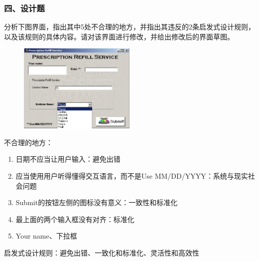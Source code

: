 \subsubsection*{四、设计题}
\setcounter{problemname}{0}

\begin{problem}
分析下图界面，指出其中5处不合理的地方，并指出其违反的2条启发式设计规则，以及该规则的具体内容。请对该界面进行修改，并给出修改后的界面草图。
\begin{figure}[H]
    \vspace{-0.5em}
	\centering
	\includegraphics[width=0.5\textwidth]{1.png}
    \vspace{-1em}
\end{figure}
\end{problem}

\begin{solution}
不合理的地方：
\begin{enumerate}[label=\arabic*.]
    \item 日期不应当让用户输入：避免出错
    \item 应当使用用户听得懂得交互语言，而不是Use MM/DD/YYYY：系统与现实社会问题
    \item Submit的按钮左侧的图标没有意义：一致性和标准化
    \item 最上面的两个输入框没有对齐：标准化
    \item Your name、下拉框
\end{enumerate}

启发式设计规则：避免出错、一致化和标准化、灵活性和高效性
\end{solution}




